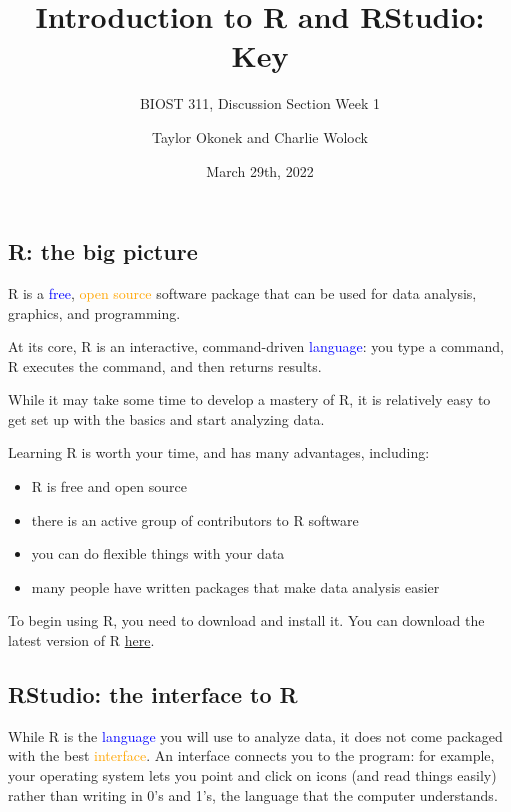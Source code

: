 \documentclass[
]{article}
\title{Introduction to R and RStudio: Key}
\subtitle{BIOST 311, Discussion Section Week 1}
\author{Taylor Okonek and Charlie Wolock}
\date{March 29th, 2022}
\providecommand{\tightlist}{%
  \setlength{\itemsep}{0pt}\setlength{\parskip}{0pt}}
\begin{document}
\maketitle

{
\setcounter{tocdepth}{2}
\tableofcontents
}
\hypertarget{r-the-big-picture}{%
\subsection{R: the big picture}\label{r-the-big-picture}}

R is a \textcolor{blue}{free}, \textcolor{orange}{open source} software
package that can be used for data analysis, graphics, and programming.

At its core, R is an interactive, command-driven
\textcolor{blue}{language}: you type a command, R executes the command,
and then returns results.

While it may take some time to develop a mastery of R, it is relatively
easy to get set up with the basics and start analyzing data.

Learning R is worth your time, and has many advantages, including:

\begin{itemize}
\tightlist
\item
  R is free and open source
\item
  there is an active group of contributors to R software
\item
  you can do flexible things with your data
\item
  many people have written packages that make data analysis easier
\end{itemize}

To begin using R, you need to download and install it. You can download
the latest version of R \href{https://www.r-project.org/}{here}.

\hypertarget{rstudio-the-interface-to-r}{%
\subsection{RStudio: the interface to
R}\label{rstudio-the-interface-to-r}}

While R is the \textcolor{blue}{language} you will use to analyze data,
it does not come packaged with the best \textcolor{orange}{interface}.
An interface connects you to the program: for example, your operating
system lets you point and click on icons (and read things easily) rather
than writing in 0's and 1's, the language that the computer understands.
\end{document}
